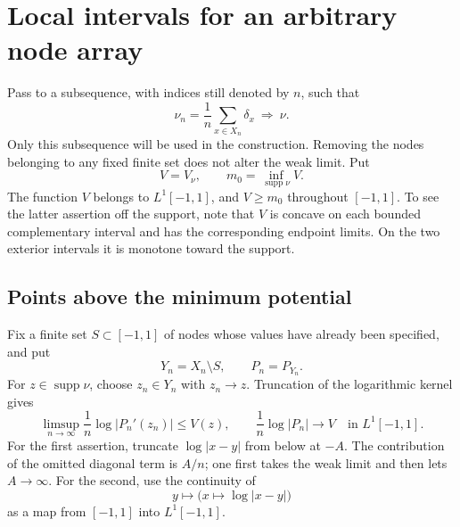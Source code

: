 \documentclass[11pt]{article}
\theoremstyle{definition}
\numberwithin{equation}{section}
\DeclareMathOperator{\supp}{supp}
\begin{document}
\section{Local intervals for an arbitrary node array}
\label{sec:arbitrary}

Pass to a subsequence, with indices still denoted by \(n\), such that
\begin{equation}\label{eq:weak-limit}
 \nu_n=\frac1n\sum_{x\in X_n}\delta_x
 \ \Longrightarrow\ \nu.
\end{equation}
Only this subsequence will be used in the construction.
Removing the nodes belonging to any fixed finite set does not
alter the weak limit.
Put
\[
 V=V_\nu,\qquad
 m_0=\inf_{\supp\nu}V.
\]
The function \(V\) belongs to \(L^1[-1,1]\), and \(V\ge m_0\)
throughout \([-1,1]\).
To see the latter assertion off the support, note that \(V\) is
concave on each bounded complementary interval and has the
corresponding endpoint limits. On the two exterior intervals it
is monotone toward the support.

\subsection{Points above the minimum potential}
\label{subsec:high-potential}

Fix a finite set \(S\subset[-1,1]\) of nodes whose values have already
been specified, and put
\[
 Y_n=X_n\setminus S,\qquad P_n=P_{Y_n}.
\]
For \(z\in\supp\nu\), choose \(z_n\in Y_n\) with \(z_n\to z\).
Truncation of the logarithmic kernel gives
\begin{equation}\label{eq:potential-limits}
 \limsup_{n\to\infty}\frac1n\log|P_n'(z_n)|\le V(z),
 \qquad
 \frac1n\log|P_n|\longrightarrow V
 \quad\text{in }L^1[-1,1].
\end{equation}
For the first assertion, truncate \(\log|x-y|\) from below at
\(-A\). The contribution of the omitted diagonal term is \(A/n\);
one first takes the weak limit and then lets \(A\to\infty\).
For the second, use the continuity of
\[
 y\longmapsto\bigl(x\longmapsto\log|x-y|\bigr)
\]
as a map from \([-1,1]\) into \(L^1[-1,1]\).
\end{document}
